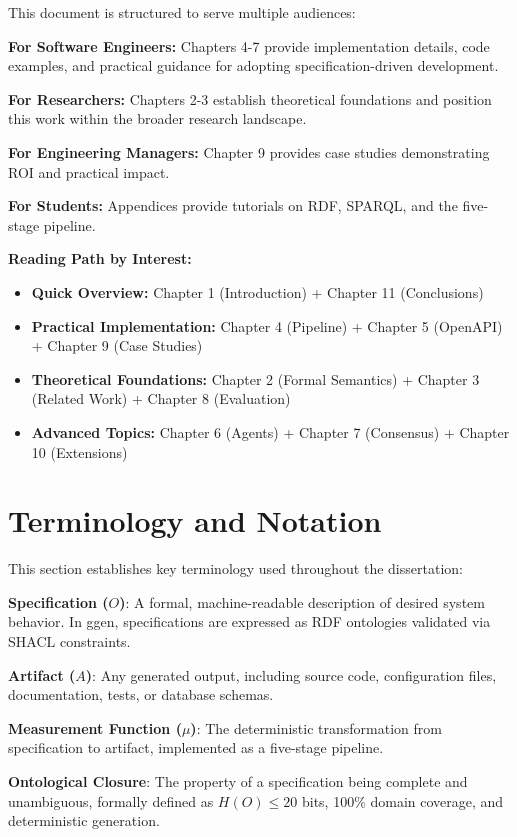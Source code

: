 This document is structured to serve multiple audiences:

\textbf{For Software Engineers:} Chapters 4-7 provide implementation details, code examples, and practical guidance for adopting specification-driven development.

\textbf{For Researchers:} Chapters 2-3 establish theoretical foundations and position this work within the broader research landscape.

\textbf{For Engineering Managers:} Chapter 9 provides case studies demonstrating ROI and practical impact.

\textbf{For Students:} Appendices provide tutorials on RDF, SPARQL, and the five-stage pipeline.

\textbf{Reading Path by Interest:}
\begin{itemize}
    \item \textbf{Quick Overview:} Chapter 1 (Introduction) + Chapter 11 (Conclusions)
    \item \textbf{Practical Implementation:} Chapter 4 (Pipeline) + Chapter 5 (OpenAPI) + Chapter 9 (Case Studies)
    \item \textbf{Theoretical Foundations:} Chapter 2 (Formal Semantics) + Chapter 3 (Related Work) + Chapter 8 (Evaluation)
    \item \textbf{Advanced Topics:} Chapter 6 (Agents) + Chapter 7 (Consensus) + Chapter 10 (Extensions)
\end{itemize}

\section{Terminology and Notation}

This section establishes key terminology used throughout the dissertation:

\textbf{Specification (\(O\))}: A formal, machine-readable description of desired system behavior. In ggen, specifications are expressed as RDF ontologies validated via SHACL constraints.

\textbf{Artifact (\(A\))}: Any generated output, including source code, configuration files, documentation, tests, or database schemas.

\textbf{Measurement Function (\(\mu\))}: The deterministic transformation from specification to artifact, implemented as a five-stage pipeline.

\textbf{Ontological Closure}: The property of a specification being complete and unambiguous, formally defined as \(H(O) \leq 20\) bits, 100\% domain coverage, and deterministic generation.

